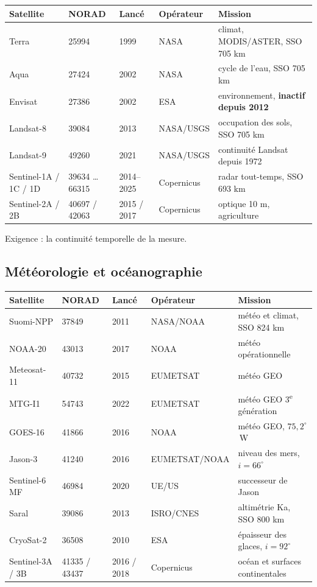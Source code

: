 \documentclass[11pt]{article}
\begin{document}
\begin{center}
\footnotesize\setlength{\tabcolsep}{4pt}
\begin{tabular}{lllll}
\toprule
Satellite & NORAD & Lancé & Opérateur & Mission \\
\midrule
Terra & 25994 & 1999 & NASA & climat, MODIS/ASTER, SSO 705 km \\
Aqua & 27424 & 2002 & NASA & cycle de l'eau, SSO 705 km \\
Envisat & 27386 & 2002 & ESA & environnement, \textbf{inactif depuis 2012} \\
Landsat-8 & 39084 & 2013 & NASA/USGS & occupation des sols, SSO 705 km \\
Landsat-9 & 49260 & 2021 & NASA/USGS & continuité Landsat depuis 1972 \\
Sentinel-1A / 1C / 1D & 39634 \dots 66315 & 2014--2025 & Copernicus & radar tout-temps, SSO 693 km \\
Sentinel-2A / 2B & 40697 / 42063 & 2015 / 2017 & Copernicus & optique 10 m, agriculture \\
\bottomrule
\end{tabular}
\end{center}

\noindent Exigence : la continuité temporelle de la mesure. 


\subsection*{Météorologie et océanographie}

\begin{center}
\footnotesize\setlength{\tabcolsep}{4pt}
\begin{tabular}{lllll}
\toprule
Satellite & NORAD & Lancé & Opérateur & Mission \\
\midrule
Suomi-NPP & 37849 & 2011 & NASA/NOAA & météo et climat, SSO 824 km \\
NOAA-20 & 43013 & 2017 & NOAA & météo opérationnelle \\
Meteosat-11 & 40732 & 2015 & EUMETSAT & météo GEO \\
MTG-I1 & 54743 & 2022 & EUMETSAT & météo GEO 3\textsuperscript{e} génération \\
GOES-16 & 41866 & 2016 & NOAA & météo GEO, $75{,}2^\circ$\,W \\
Jason-3 & 41240 & 2016 & EUMETSAT/NOAA & niveau des mers, $i = 66^\circ$ \\
Sentinel-6 MF & 46984 & 2020 & UE/US & successeur de Jason \\
Saral & 39086 & 2013 & ISRO/CNES & altimétrie Ka, SSO 800 km \\
CryoSat-2 & 36508 & 2010 & ESA & épaisseur des glaces, $i = 92^\circ$ \\
Sentinel-3A / 3B & 41335 / 43437 & 2016 / 2018 & Copernicus & océan et surfaces continentales \\
\bottomrule
\end{tabular}
\end{center}
\end{document}

